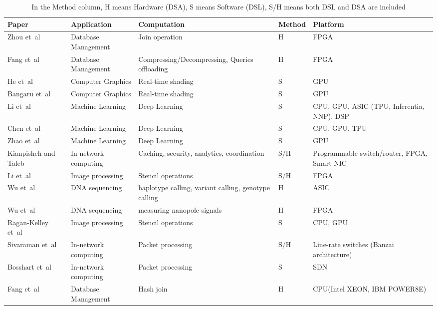 \documentclass[conference]{IEEEtran}
\begin{document}
\begin{table}[t]
\centering
\begin{tabularx}{\textwidth}{|l|X|X|X|X|}
\hline
\textbf{Paper} & \textbf{Application} & \textbf{Computation} & \textbf{Method} & \textbf{Platform} \\ \hline

Zhou et~al \cite{ref1}  & Database Management & Join operation & H & FPGA \\ \hline
Fang et~al \cite{ref2}  & Database Management & Compressing/Decompressing, Queries offloading & H & FPGA \\ \hline
He et~al \cite{ref3}  & Computer Graphics & Real-time shading & S & GPU \\ \hline
Bangaru et~al \cite{ref4}  & Computer Graphics & Real-time shading & S & GPU \\ \hline
Li et~al \cite{ref5}  & Machine Learning & Deep Learning & S & CPU, GPU, ASIC (TPU, Inferentia, NNP), DSP \\ \hline
Chen et~al \cite{ref6}  & Machine Learning & Deep Learning & S & CPU, GPU, TPU \\ \hline
Zhao et~al \cite{ref7}  &  Machine Learning & Deep Learning & S & GPU \\ \hline
Kianpisheh and Taleb \cite{ref8} & In-network computing & Caching, security, analytics, coordination & S/H & Programmable switch/router, FPGA, Smart NIC \\ \hline
Li et~al \cite{ref9}  & Image processing & Stencil operations & S/H & FPGA \\ \hline
Wu et~al \cite{ref10} & DNA sequencing & haplotype calling, variant calling, genotype calling & H & ASIC \\ \hline
Wu et~al \cite{ref11} & DNA sequencing & measuring nanopole signals & H & FPGA \\ \hline
Ragan-Kelley et~al \cite{ref12} & Image processing & Stencil operations & S & CPU, GPU \\ \hline
Sivaraman et~al \cite{ref13} & In-network computing & Packet processing & S/H & Line-rate switches (Banzai architecture) \\ \hline
Bosshart et~al \cite{ref14} & In-network computing & Packet processing & S & SDN \\ \hline
Fang et~al \cite{ref15} & Database Management & Hash join & H & CPU(Intel XEON, IBM POWER8E) \\ \hline

\end{tabularx}
\setlength{\abovecaptionskip}{10pt}
\caption{In the Method column, H means Hardware (DSA), S means Software (DSL), S/H means both DSL and DSA are included}
\label{tab:papers}
\end{table}
\end{document}
